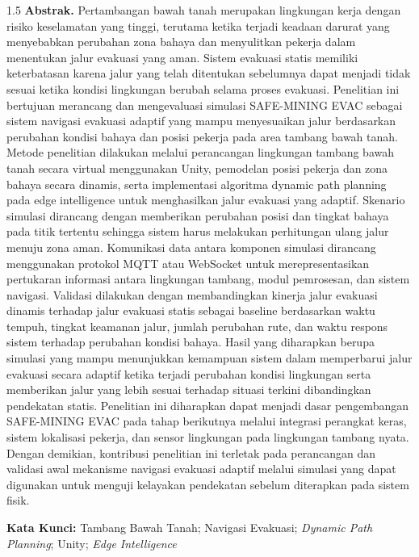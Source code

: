 \documentclass[10pt,a4paper]{article}
\begin{document}
\begin{spacing}{1.5}
\noindent\textbf{Abstrak.} %
Pertambangan bawah tanah merupakan lingkungan kerja dengan risiko keselamatan yang tinggi, terutama ketika terjadi keadaan darurat yang menyebabkan perubahan zona bahaya dan menyulitkan pekerja dalam menentukan jalur evakuasi yang aman. Sistem evakuasi statis memiliki keterbatasan karena jalur yang telah ditentukan sebelumnya dapat menjadi tidak sesuai ketika kondisi lingkungan berubah selama proses evakuasi. Penelitian ini bertujuan merancang dan mengevaluasi simulasi SAFE-MINING EVAC sebagai sistem navigasi evakuasi adaptif yang mampu menyesuaikan jalur berdasarkan perubahan kondisi bahaya dan posisi pekerja pada area tambang bawah tanah. Metode penelitian dilakukan melalui perancangan lingkungan tambang bawah tanah secara virtual menggunakan Unity, pemodelan posisi pekerja dan zona bahaya secara dinamis, serta implementasi algoritma dynamic path planning pada edge intelligence untuk menghasilkan jalur evakuasi yang adaptif. Skenario simulasi dirancang dengan memberikan perubahan posisi dan tingkat bahaya pada titik tertentu sehingga sistem harus melakukan perhitungan ulang jalur menuju zona aman. Komunikasi data antara komponen simulasi dirancang menggunakan protokol MQTT atau WebSocket untuk merepresentasikan pertukaran informasi antara lingkungan tambang, modul pemrosesan, dan sistem navigasi. Validasi dilakukan dengan membandingkan kinerja jalur evakuasi dinamis terhadap jalur evakuasi statis sebagai baseline berdasarkan waktu tempuh, tingkat keamanan jalur, jumlah perubahan rute, dan waktu respons sistem terhadap perubahan kondisi bahaya. Hasil yang diharapkan berupa simulasi yang mampu menunjukkan kemampuan sistem dalam memperbarui jalur evakuasi secara adaptif ketika terjadi perubahan kondisi lingkungan serta memberikan jalur yang lebih sesuai terhadap situasi terkini dibandingkan pendekatan statis. Penelitian ini diharapkan dapat menjadi dasar pengembangan SAFE-MINING EVAC pada tahap berikutnya melalui integrasi perangkat keras, sistem lokalisasi pekerja, dan sensor lingkungan pada lingkungan tambang nyata. Dengan demikian, kontribusi penelitian ini terletak pada perancangan dan validasi awal mekanisme navigasi evakuasi adaptif melalui simulasi yang dapat digunakan untuk menguji kelayakan pendekatan sebelum diterapkan pada sistem fisik.
\end{spacing}
\vspace{4pt}
\noindent\textbf{Kata Kunci:} Tambang Bawah Tanah; Navigasi Evakuasi; \emph{Dynamic Path Planning}; Unity; \emph{Edge Intelligence}
\end{document}
